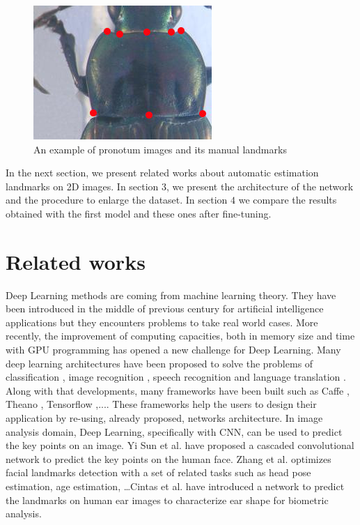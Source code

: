 \documentclass[10pt]{article}
\begin{document}
\begin{figure}[htbp]
\centering
	\centerline{\includegraphics[scale=0.8]{images/pronotum}}
	\caption{\small{An example of pronotum images and its manual landmarks}}
	\label{figpronotum}
\end{figure}

In the next section, we present related works about automatic
estimation landmarks on 2D images. In section $3$, we present the
architecture of the network and the procedure to enlarge the dataset. In section $4$ we compare the results obtained with the first
model and these ones after fine-tuning. 


\section{Related works}
Deep Learning methods are coming from machine learning theory. They
have been introduced in the middle of previous century for artificial
intelligence applications but they encounters problems to
take real world cases. More recently, the improvement of computing capacities, both in
memory size and time with GPU programming has opened a new challenge  
for Deep Learning. Many deep learning architectures have been proposed
to solve the problems of classification \cite{krizhevsky2012imagenet,
  ciregan2012multi}, image recognition \cite{szegedy2015going,
  farabet2013learning, li2015convolutional}, speech recognition
\cite{mikolov2011strategies, hinton2012deep} and language translation
\cite{jean2014using, sutskever2014sequence}. Along with that
developments, many frameworks have been built such as Caffe
\cite{jia2014caffe}, Theano \cite{2016arXiv160502688short}, Tensorflow
\cite{tensorflow2015},.... These frameworks help
the users to design their application by re-using, already proposed, networks
architecture. In image analysis domain,
Deep Learning, specifically with CNN, can be used to predict the key points on
an image. Yi Sun et al. \cite{sun2013deep} have proposed a cascaded
convolutional network to predict the key points on the human
face. Zhang et al. \cite{zhang2014facial} optimizes facial landmarks
detection with a set of related tasks such as head pose estimation,
age estimation, \ldots Cintas et al. \cite{cintas2016automatic} have
introduced a network to predict the landmarks on human ear images to
characterize ear shape for biometric analysis.
\end{document}
